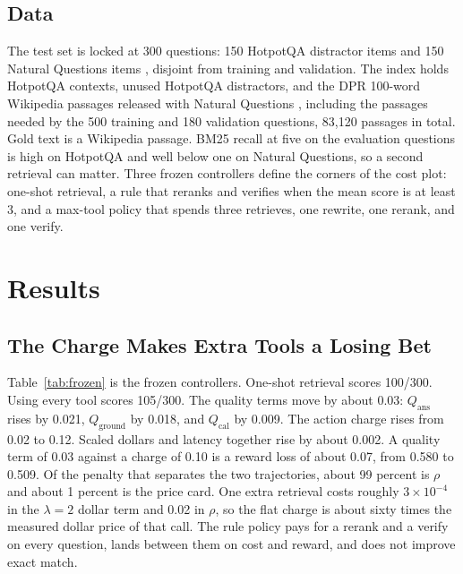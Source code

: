 \documentclass[letterpaper]{article} %
\begin{document}
\subsection{Data}
The test set is locked at 300 questions: 150 HotpotQA distractor items \cite{yang2018hotpotqa} and 150 Natural Questions items \cite{kwiatkowski2019nq}, disjoint from training and validation. The index holds HotpotQA contexts, unused HotpotQA distractors, and the DPR 100-word Wikipedia passages released with Natural Questions \cite{karpukhin2020dpr,gao2022tevatron}, including the passages needed by the 500 training and 180 validation questions, 83{,}120 passages in total. Gold text is a Wikipedia passage. BM25 recall at five on the evaluation questions is high on HotpotQA and well below one on Natural Questions, so a second retrieval can matter. Three frozen controllers define the corners of the cost plot: one-shot retrieval, a rule that reranks and verifies when the mean score is at least 3, and a max-tool policy that spends three retrieves, one rewrite, one rerank, and one verify.

\section{Results}

\subsection{The Charge Makes Extra Tools a Losing Bet}
Table~\ref{tab:frozen} is the frozen controllers. One-shot retrieval scores 100/300. Using every tool scores 105/300. The quality terms move by about 0.03: \(Q_{\mathrm{ans}}\) rises by 0.021, \(Q_{\mathrm{ground}}\) by 0.018, and \(Q_{\mathrm{cal}}\) by 0.009. The action charge rises from 0.02 to 0.12. Scaled dollars and latency together rise by about 0.002. A quality term of 0.03 against a charge of 0.10 is a reward loss of about 0.07, from 0.580 to 0.509. Of the penalty that separates the two trajectories, about 99 percent is \(\rho\) and about 1 percent is the price card. One extra retrieval costs roughly \(3\times 10^{-4}\) in the \(\lambda{=}2\) dollar term and 0.02 in \(\rho\), so the flat charge is about sixty times the measured dollar price of that call. The rule policy pays for a rerank and a verify on every question, lands between them on cost and reward, and does not improve exact match.
\end{document}
